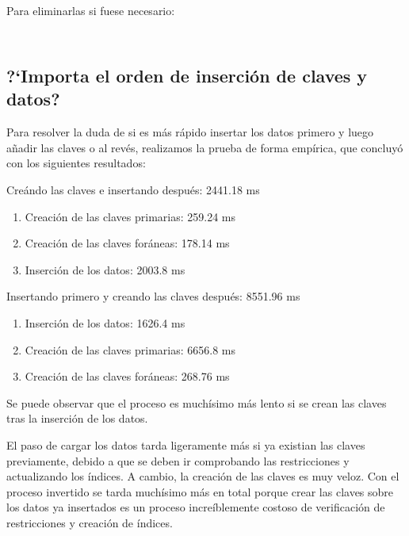 \documentclass[a4paper, 11pt, oneside]{article} %
\newcommand{\scriptdir}{../scripts/} %
\begin{document}
\inputminted{mysql}{\scriptdir set_table_primary_keys.sql}

\inputminted{mysql}{\scriptdir set_table_foreign_keys.sql}

Para eliminarlas si fuese necesario:

\inputminted{mysql}{\scriptdir drop_table_primary_keys.sql}

\inputminted{mysql}{\scriptdir drop_table_foreign_keys.sql}




\subsection{?`Importa el orden de inserción de claves y datos?}

Para resolver la duda de si es más rápido insertar los datos primero y luego añadir las claves o al revés, realizamos la prueba de forma empírica, que concluyó con los siguientes resultados:

Creándo las claves e insertando después: 2441.18 ms

\begin{enumerate}
	\item Creación de las claves primarias: 259.24 ms 
	\item Creación de las claves foráneas: 178.14 ms
	\item Inserción de los datos: 2003.8 ms
\end{enumerate}

Insertando primero y creando las claves después: 8551.96 ms

\begin{enumerate}
	\item Inserción de los datos: 1626.4 ms
	\item Creación de las claves primarias: 6656.8 ms
	\item Creación de las claves foráneas: 268.76 ms
\end{enumerate}

Se puede observar que el proceso es muchísimo más lento si se crean las claves tras la inserción de los datos.

El paso de cargar los datos tarda ligeramente más si ya existian las claves previamente, debido a que se deben ir comprobando las restricciones y actualizando los índices. A cambio, la creación de las claves es muy veloz. Con el proceso invertido se tarda muchísimo más en total porque crear las claves sobre los datos ya insertados es un proceso increíblemente costoso de verificación de restricciones y creación de índices.
	
\end{document}
